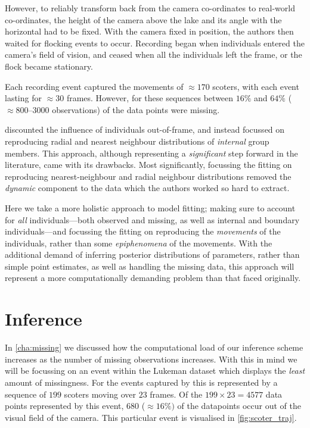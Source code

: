 However, to reliably transform back from the camera co-ordinates to real-world
co-ordinates, the height of the camera above the lake and its angle with the
horizontal had to be fixed. With the camera fixed in position, the authors then
waited for flocking events to occur. Recording began when individuals entered
the camera's field of vision, and ceased when all the individuals left the
frame, or the flock became stationary.

Each recording event captured the movements of $\approx170$ scoters, with each
event lasting for $\approx30$ frames. However, for these sequences between
$16\%$ and $64\%$ ($\approx800$--$3000$ observations)
of the data points were missing.

\textcite{lukeman10} discounted the influence of individuals out-of-frame, and
instead focussed on reproducing radial and nearest neighbour distributions of
\emph{internal} group members. This approach, although representing a
\emph{significant} step forward in the literature, came with its drawbacks.
Most significantly, focussing the fitting on reproducing nearest-neighbour and
radial neighbour distributions removed the \emph{dynamic} component to the data
which the authors worked so hard to extract.

Here we take a more holistic approach to model fitting; making sure to account
for \emph{all} individuals---both observed and missing, as well as internal and
boundary individuals---and focussing the fitting on reproducing the
\emph{movements} of the individuals, rather than some \emph{epiphenomena} of
the movements. With the additional demand of inferring posterior distributions
of parameters, rather than simple point estimates, as well as handling the
missing data, this approach will represent a more computationally demanding
problem than that faced originally.

\section{Inference}

In \cref{cha:missing} we discussed how the computational load of our inference
scheme increases as the number of missing observations increases. With this in
mind we will be focussing on an event within the Lukeman dataset which displays
the \emph{least} amount of missingness. For the events captured by
\textcite{lukeman10} this is represented by a sequence of $199$ scoters moving
over $23$ frames. Of the $199\times23=4577$ data points represented by this
event, $680$ ($\approx16\%)$ of the datapoints occur out of the visual field of
the camera. This particular event is visualised in \cref{fig:scoter_traj}.

